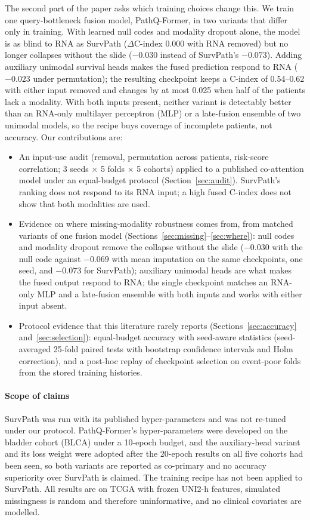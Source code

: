 \documentclass{article}
\newcommand{\pq}{PathQ-Former}
\newcommand{\cindex}{C-index}
\begin{document}
The second part of the paper asks which training choices change this. We train one query-bottleneck fusion model, \pq{}, in two variants that differ only in training. With learned null codes and modality dropout alone, the model is as blind to RNA as SurvPath ($\Delta$\cindex{} $0.000$ with RNA removed) but no longer collapses without the slide ($-0.030$ instead of SurvPath's $-0.073$). Adding auxiliary unimodal survival heads makes the fused prediction respond to RNA ($-0.023$ under permutation); the resulting checkpoint keeps a \cindex{} of 0.54--0.62 with either input removed and changes by at most 0.025 when half of the patients lack a modality. With both inputs present, neither variant is detectably better than an RNA-only multilayer perceptron (MLP) or a late-fusion ensemble of two unimodal models, so the recipe buys coverage of incomplete patients, not accuracy. Our contributions are:
\begin{itemize}
\item An input-use audit (removal, permutation across patients, risk-score correlation; 3 seeds $\times$ 5 folds $\times$ 5 cohorts) applied to a published co-attention model under an equal-budget protocol (Section~\ref{sec:audit}). SurvPath's ranking does not respond to its RNA input; a high fused \cindex{} does not show that both modalities are used.
\item Evidence on where missing-modality robustness comes from, from matched variants of one fusion model (Sections~\ref{sec:missing}--\ref{sec:where}): null codes and modality dropout remove the collapse without the slide ($-0.030$ with the null code against $-0.069$ with mean imputation on the same checkpoints, one seed, and $-0.073$ for SurvPath); auxiliary unimodal heads are what makes the fused output respond to RNA; the single checkpoint matches an RNA-only MLP and a late-fusion ensemble with both inputs and works with either input absent.
\item Protocol evidence that this literature rarely reports (Sections~\ref{sec:accuracy} and~\ref{sec:selection}): equal-budget accuracy with seed-aware statistics (seed-averaged 25-fold paired tests with bootstrap confidence intervals and Holm correction), and a post-hoc replay of checkpoint selection on event-poor folds from the stored training histories.
\end{itemize}

\paragraph{Scope of claims} SurvPath was run with its published hyper-parameters and was not re-tuned under our protocol. \pq{}'s hyper-parameters were developed on the bladder cohort (BLCA) under a 10-epoch budget, and the auxiliary-head variant and its loss weight were adopted after the 20-epoch results on all five cohorts had been seen, so both variants are reported as co-primary and no accuracy superiority over SurvPath is claimed. The training recipe has not been applied to SurvPath. All results are on TCGA with frozen UNI2-h features, simulated missingness is random and therefore uninformative, and no clinical covariates are modelled.
\end{document}
